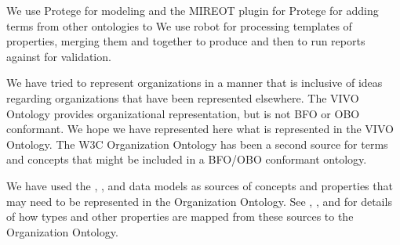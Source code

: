 \documentclass[letterpaper,10pt,english]{sphinxmanual}
\begin{document}
\sphinxAtStartPar
We use Protege  for modeling  and the MIREOT plug\sphinxhyphen{}in for
Protege  for
adding terms from other ontologies to   We use robot  for
processing templates of properties, merging them and  together to
produce  and then to run reports against  for validation.

\sphinxAtStartPar
We have tried to represent organizations in a manner that is inclusive of ideas
regarding organizations that have been represented elsewhere.  The VIVO
Ontology 
provides organizational representation, but is not BFO or OBO conformant.  We
hope we have represented here what is represented in the VIVO Ontology.  The W3C
Organization Ontology  has been a second source for terms and
concepts that might be included in a BFO/OBO conformant ontology.

\sphinxAtStartPar
We have used the , , and  data models as sources of
concepts and properties that may need to be represented in the Organization
Ontology.  See {\hyperref[\detokenize{vivo-to-org::doc}]{}}, {\hyperref[\detokenize{ror-to-org::doc}]{}}, and {\hyperref[\detokenize{schema-to-org::doc}]{}} for
details of how
types and other properties are mapped from these sources to the Organization Ontology.
\end{document}

